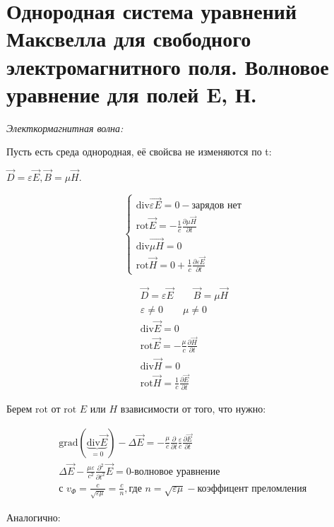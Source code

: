 \section{Однородная система уравнений Максвелла для свободного
электромагнитного поля. Волновое уравнение для полей E, Н.}

\textit{Электкормагнитная волна:}

Пусть есть среда однородная, её свойсва не изменяются по t: 

\( \vec{D}=\varepsilon\vec{E}, \vec{B}=\mu\vec{H} \).

\[
\begin{cases}
    \mathrm{div}\vec{\varepsilon E}=0 -\text{зарядов нет} \\
    \mathrm{rot}\vec{E}=-\frac{1}{c} \frac{\partial\mu\vec{H}}{\partial t} \\
    \mathrm{div}\vec{\mu H}=0 \\
    \mathrm{rot}\vec{H}=0+\frac{1}{c} \frac{\partial\varepsilon\vec{E}}{\partial t}  
\end{cases}
\]

\begin{gather*}
    \vec{D}=\varepsilon\vec{E} \qquad \vec{B}=\mu\vec{H} \\
    \varepsilon\neq0 \qquad \mu\neq0 \qquad \\
    \mathrm{div}\vec{E}=0 \\
    \mathrm{rot}\vec{E}=-\frac{\mu}{c} \frac{\partial\vec{H}}{\partial t} \\
    \mathrm{div}\vec{H}=0 \\
    \mathrm{rot}\vec{H}=\frac{1}{c} \frac{\partial\vec{E}}{\partial t}  
\end{gather*}

Берем \( \mathrm{rot}  \) от \( \mathrm{rot}  \) \( E \) или \( H \) взависимости от того, что нужно:

\begin{gather*}
    \mathrm{grad}(\underbrace{\mathrm{div}\vec{E} }_{=0})-\Delta\vec{E}=-\frac{\mu}{c}\frac{\partial}{\partial t} \frac{\varepsilon}{c}\frac{\partial\vec{E}}{\partial t} \\
    \Delta\vec{E}-\frac{\mu\varepsilon}{c^2}\frac{\partial^2}{\partial t^2}\vec{E}=0 \text{-волновое уравнение} \\
    \text{с } v_{\Phi}=\frac{c}{\sqrt{\varepsilon\mu}}=\frac{c}{n}, \text{где } n=\sqrt{\varepsilon\mu}-\text{коэффицент преломления }   
\end{gather*}

Аналогично: 

